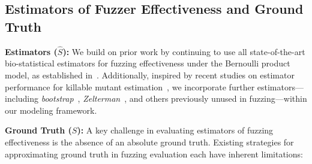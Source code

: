 \documentclass[conference]{IEEEtran}
\begin{document}
%

%
%


\subsection{Estimators of Fuzzer Effectiveness and Ground Truth}
\label{sec:reachability}

\noindent\textbf{Estimators ($\hat{S}$):} We build on prior work by continuing to use all state-of-the-art bio-statistical estimators for fuzzing effectiveness under the Bernoulli product model, as established in~\cite{liyanage2023reachable}. Additionally, inspired by recent studies on estimator performance for killable mutant estimation~\cite{Kuznetsov2024empirical}, we incorporate further estimators—including \emph{bootstrap}~\cite{smith1984nonparametric}, \emph{Zelterman}~\cite{bohning2010some}, and others previously unused in fuzzing—within our modeling framework.
\vspace{1mm}

\noindent\textbf{Ground Truth ($S$):} A key challenge in evaluating estimators of fuzzing effectiveness is the absence of an absolute ground truth. Existing strategies for approximating ground truth in fuzzing evaluation each have inherent limitations:
\end{document}
